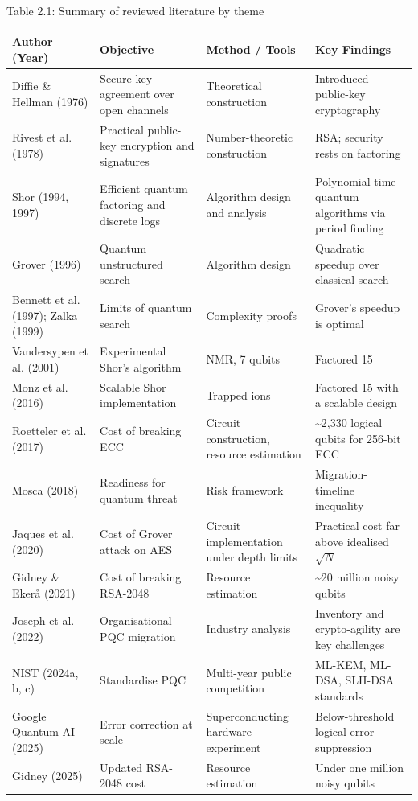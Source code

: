 \documentclass[12pt,oneside]{report}
\begin{document}
\label{tab:2.1}Table 2.1: Summary of reviewed literature by theme
\par

\begin{center}\small\begin{tabularx}{\textwidth}{|W|W|W|W|}\hline
Author (Year) & Objective & Method / Tools & Key Findings \\\hline
Diffie \& Hellman (1976) & Secure key agreement over open channels & Theoretical construction & Introduced public-key cryptography \\\hline
Rivest et al. (1978) & Practical public-key encryption and signatures & Number-theoretic construction & RSA; security rests on factoring \\\hline
Shor (1994, 1997) & Efficient quantum factoring and discrete logs & Algorithm design and analysis & Polynomial-time quantum algorithms via period finding \\\hline
Grover (1996) & Quantum unstructured search & Algorithm design & Quadratic speedup over classical search \\\hline
Bennett et al. (1997); Zalka (1999) & Limits of quantum search & Complexity proofs & Grover's speedup is optimal \\\hline
Vandersypen et al. (2001) & Experimental Shor's algorithm & NMR, 7 qubits & Factored 15 \\\hline
Monz et al. (2016) & Scalable Shor implementation & Trapped ions & Factored 15 with a scalable design \\\hline
Roetteler et al. (2017) & Cost of breaking ECC & Circuit construction, resource estimation & \textasciitilde{}2,330 logical qubits for 256-bit ECC \\\hline
Mosca (2018) & Readiness for quantum threat & Risk framework & Migration-timeline inequality \\\hline
Jaques et al. (2020) & Cost of Grover attack on AES & Circuit implementation under depth limits & Practical cost far above idealised $\sqrt{N}$ \\\hline
Gidney \& Ekerå (2021) & Cost of breaking RSA-2048 & Resource estimation & \textasciitilde{}20 million noisy qubits \\\hline
Joseph et al. (2022) & Organisational PQC migration & Industry analysis & Inventory and crypto-agility are key challenges \\\hline
NIST (2024a, b, c) & Standardise PQC & Multi-year public competition & ML-KEM, ML-DSA, SLH-DSA standards \\\hline
Google Quantum AI (2025) & Error correction at scale & Superconducting hardware experiment & Below-threshold logical error suppression \\\hline
Gidney (2025) & Updated RSA-2048 cost & Resource estimation & Under one million noisy qubits \\\hline\end{tabularx}\end{center}
\end{document}
